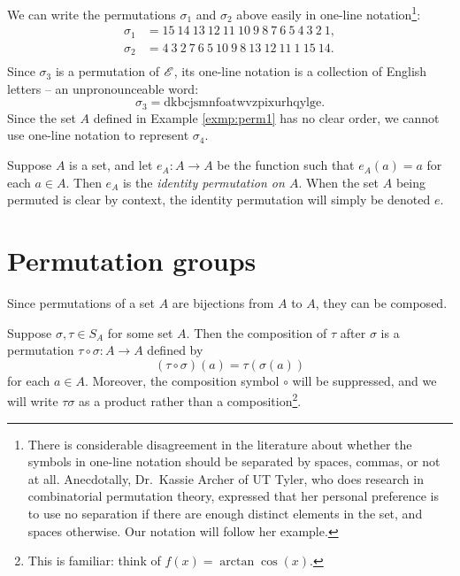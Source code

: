 \documentclass[m3380-lec-main.tex]{subfiles}
\begin{document}
\begin{exmp} We can write the permutations $\sigma_1$ and $\sigma_2$ above easily in one-line notation\footnote{There is considerable disagreement in the literature about whether the symbols in one-line notation should be separated by spaces, commas, or not at all. Anecdotally, Dr.~Kassie Archer of UT Tyler, who does research in combinatorial permutation theory, expressed that her personal preference is to use no separation if there are enough distinct elements in the set, and spaces otherwise. Our notation will follow her example.}:
\begin{align*}
\sigma_1 &= 15~14~13~12~11~10~9~8~7~6~5~4~3~2~1, \\
\sigma_2 &= 4~3~2~7~6~5~10~9~8~13~12~11~1~15~14. \\
\end{align*}
Since $\sigma_3$ is a permutation of $\mathscr{E}$, its one-line notation is a collection of English letters -- an unpronounceable word:
\[\sigma_3 = \text{dkbcjsmnfoatwvzpixurhqylge}.\]
Since the set $A$ defined in Example \ref{exmp:perm1} has no clear order, we cannot use one-line notation to represent $\sigma_4$.
\end{exmp}

\begin{defn} Suppose $A$ is a set, and let $e_A:A\to A$ be the function such that $e_A(a)=a$ for each $a\in A$. Then $e_A$ is the \emph{identity permutation on $A$}. When the set $A$ being permuted is clear by context, the identity permutation will simply be denoted $e$.
\end{defn}

\section{Permutation groups}
Since permutations of a set $A$ are bijections from $A$ to $A$, they can be composed.
\begin{thm}Suppose $\sigma,\tau\in S_A$ for some set $A$. Then the composition of $\tau$ after $\sigma$ is a permutation $\tau\circ\sigma:A\to A$ defined by
\[(\tau\circ\sigma)(a) = \tau(\sigma(a))\]
for each $a\in A$. Moreover, the composition symbol $\circ$ will be suppressed, and we will write $\tau\sigma$ as a product rather than a composition\footnote{This is familiar: think of $f(x) = \arctan\cos(x)$.}.
\end{thm}
\end{document}
